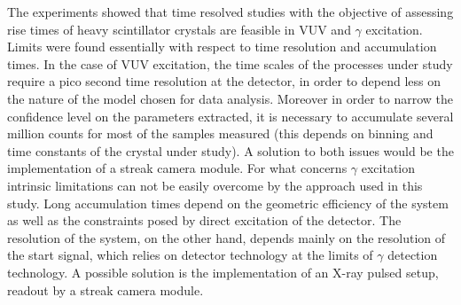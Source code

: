 The experiments showed that time resolved studies with the objective of assessing rise times of heavy scintillator crystals are feasible in VUV and $\gamma$ excitation. Limits were found essentially with respect to time resolution and accumulation times. 
In the case of VUV excitation, the time scales of the processes under study require a pico second time resolution at the detector, in order to depend less on the nature of the model chosen for data analysis. Moreover in order to narrow the confidence level on the parameters extracted, it is necessary to accumulate several million counts for most of the samples measured (this depends on binning and time constants of the crystal under study). A solution to both issues would be the implementation of a streak camera module.
For what concerns $\gamma$ excitation intrinsic limitations can not be easily overcome by the approach used in this study. Long accumulation times depend on the geometric efficiency of the system as well as the constraints posed by direct excitation of the detector. 
The resolution of the system, on the other hand, depends mainly on the resolution of the start signal, which relies on detector technology at the limits of $\gamma$  detection technology. A possible solution is the implementation of an X-ray pulsed setup, readout by a streak camera module.
